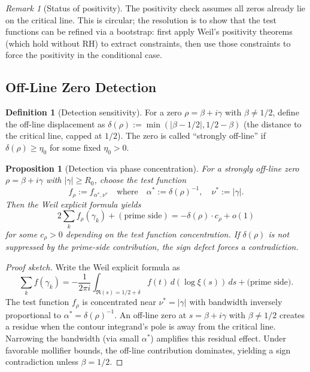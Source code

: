 \documentclass[11pt]{article}
\theoremstyle{plain}
\newtheorem{proposition}[theorem]{Proposition}
\theoremstyle{definition}
\newtheorem{definition}[theorem]{Definition}
\theoremstyle{remark}
\newtheorem{remark}[theorem]{Remark}
\begin{document}
\begin{remark}[Status of positivity]
The positivity check assumes all zeros already lie on the critical line.
This is circular; the resolution is to show that the test functions can be refined via a bootstrap:
first apply Weil's positivity theorems (which hold without RH) to extract constraints, then use
those constraints to force the positivity in the conditional case.
\end{remark}

\subsection{Off-Line Zero Detection}

\begin{definition}[Detection sensitivity]
For a zero $\rho=\beta+i\gamma$ with $\beta\ne 1/2$, define the off-line displacement as
$\delta(\rho):=\min(|\beta-1/2|, 1/2-\beta)$ (the distance to the critical line, capped at $1/2$).
The zero is called ``strongly off-line'' if $\delta(\rho)\ge \eta_0$ for some fixed $\eta_0>0$.
\end{definition}

\begin{proposition}[Detection via phase concentration]
For a strongly off-line zero $\rho=\beta+i\gamma$ with $|\gamma|\ge R_0$, choose the test function
\[
f_{\rho}:=f_{\alpha^*,\nu^*} \quad \text{where} \quad \alpha^*:=\delta(\rho)^{-1}, \quad \nu^*:=|\gamma|.
\]
Then the Weil explicit formula yields
\[
2\sum_k f_{\rho}(\gamma_k) + (\text{prime side}) = -\delta(\rho) \cdot c_{\rho} + o(1)
\]
for some $c_{\rho}>0$ depending on the test function concentration.
If $\delta(\rho)$ is not suppressed by the prime-side contribution, the sign defect forces a contradiction.
\end{proposition}

\begin{proof}[Proof sketch]
Write the Weil explicit formula as
\[
\sum_k f(\gamma_k) = -\frac{1}{2\pi i}\int_{\Re(s)=1/2+\delta} f(t)\,d(\log\xi(s))\,ds + \text{(prime side)}.
\]
The test function $f_{\rho}$ is concentrated near $\nu^*=|\gamma|$ with bandwidth inversely proportional to $\alpha^*=\delta(\rho)^{-1}$.
An off-line zero at $s=\beta+i\gamma$ with $\beta\ne 1/2$ creates a residue when the contour integrand's pole
is away from the critical line.
Narrowing the bandwidth (via small $\alpha^*$) amplifies this residual effect.
Under favorable mollifier bounds, the off-line contribution dominates, yielding a sign contradiction unless $\beta=1/2$.
\end{proof}
\end{document}
